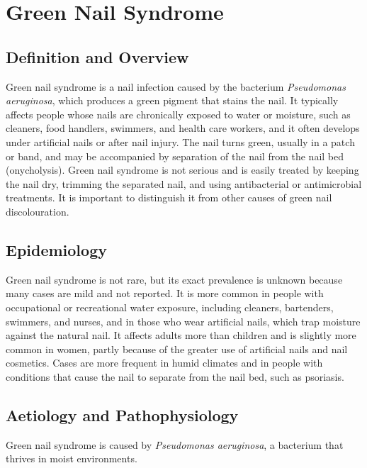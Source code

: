 \chapter{Green Nail Syndrome}

\section*{Definition and Overview}
Green nail syndrome is a nail infection caused by the bacterium \textit{Pseudomonas aeruginosa}, which produces a green pigment that stains the nail. It typically affects people whose nails are chronically exposed to water or moisture, such as cleaners, food handlers, swimmers, and health care workers, and it often develops under artificial nails or after nail injury. The nail turns green, usually in a patch or band, and may be accompanied by separation of the nail from the nail bed (onycholysis). Green nail syndrome is not serious and is easily treated by keeping the nail dry, trimming the separated nail, and using antibacterial or antimicrobial treatments. It is important to distinguish it from other causes of green nail discolouration.

\section*{Epidemiology}
Green nail syndrome is not rare, but its exact prevalence is unknown because many cases are mild and not reported. It is more common in people with occupational or recreational water exposure, including cleaners, bartenders, swimmers, and nurses, and in those who wear artificial nails, which trap moisture against the natural nail. It affects adults more than children and is slightly more common in women, partly because of the greater use of artificial nails and nail cosmetics. Cases are more frequent in humid climates and in people with conditions that cause the nail to separate from the nail bed, such as psoriasis.

\section*{Aetiology and Pathophysiology}
Green nail syndrome is caused by \textit{Pseudomonas aeruginosa}, a bacterium that thrives in moist environments.

